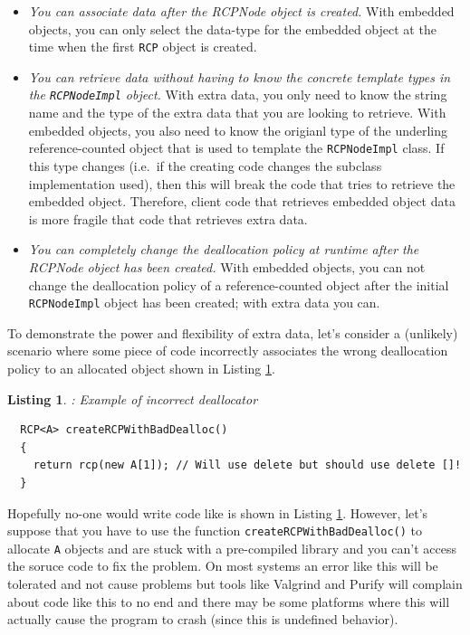 \documentclass[pdf,ps2pdf,11pt]{SANDreport}
\newtheorem{listing}{Listing}
\begin{document}
\begin{itemize}

{}\item\textit{You can associate data after the RCPNode object is
created.}  With embedded objects, you can only select the data-type
for the embedded object at the time when the first {}\texttt{RCP}
object is created.

{}\item\textit{You can retrieve data without having to know the
concrete template types in the {}\texttt{RCPNodeImpl} object.}  With
extra data, you only need to know the string name and the type of the
extra data that you are looking to retrieve.  With embedded objects,
you also need to know the origianl type of the underling
reference-counted object that is used to template the
{}\texttt{RCPNodeImpl} class.  If this type changes (i.e.\ if the
creating code changes the subclass implementation used), then this
will break the code that tries to retrieve the embedded object.
Therefore, client code that retrieves embedded object data is more
fragile that code that retrieves extra data.

{}\item\textit{You can completely change the deallocation policy at
runtime after the RCPNode object has been created.}  With embedded
objects, you can not change the deallocation policy of a
reference-counted object after the initial {}\texttt{RCPNodeImpl}
object has been created; with extra data you can.

\end{itemize}

To demonstrate the power and flexibility of extra data, let's consider
a (unlikely) scenario where some piece of code incorrectly associates
the wrong deallocation policy to an allocated object shown in Listing
{}\ref{listing:createRCPWithBadDealloc}.

\begin{listing}: Example of incorrect deallocator \\
\label{listing:createRCPWithBadDealloc}
{\small\begin{verbatim}
  RCP<A> createRCPWithBadDealloc()
  {
    return rcp(new A[1]); // Will use delete but should use delete []!
  }
\end{verbatim}}
\end{listing}

Hopefully no-one would write code like is shown in Listing
{}\ref{listing:createRCPWithBadDealloc}.  However, let's suppose that
you have to use the function {}\texttt{createRCPWithBadDealloc()} to
allocate {}\texttt{A} objects and are stuck with a pre-compiled
library and you can't access the soruce code to fix the problem.  On
most systems an error like this will be tolerated and not cause
problems but tools like Valgrind and Purify will complain about code
like this to no end and there may be some platforms where this will
actually cause the program to crash (since this is undefined
behavior).
\end{document}
